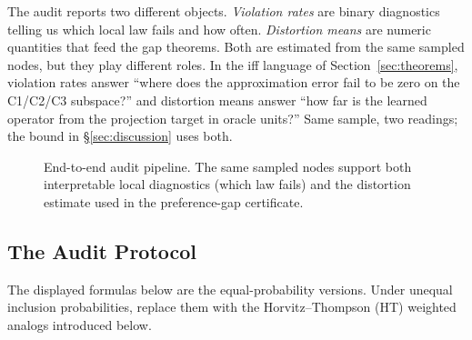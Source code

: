 The audit reports two different objects. \emph{Violation rates} are binary diagnostics telling us which local law fails and how often. \emph{Distortion means} are numeric quantities that feed the gap theorems. Both are estimated from the same sampled nodes, but they play different roles. In the iff language of Section~\ref{sec:theorems}, violation rates answer ``where does the approximation error fail to be zero on the C1/C2/C3 subspace?'' and distortion means answer ``how far is the learned operator from the projection target in oracle units?'' Same sample, two readings; the bound in \S\ref{sec:discussion} uses both.

\begin{figure}[t]
\centering
{}
\caption{End-to-end audit pipeline. The same sampled nodes support both interpretable local diagnostics (which law fails) and the distortion estimate used in the preference-gap certificate.}
\label{fig:audit-pipeline}
\end{figure}

\subsection{The Audit Protocol}

The displayed formulas below are the equal-probability versions. Under unequal inclusion probabilities, replace them with the Horvitz--Thompson (HT) weighted analogs introduced below.

